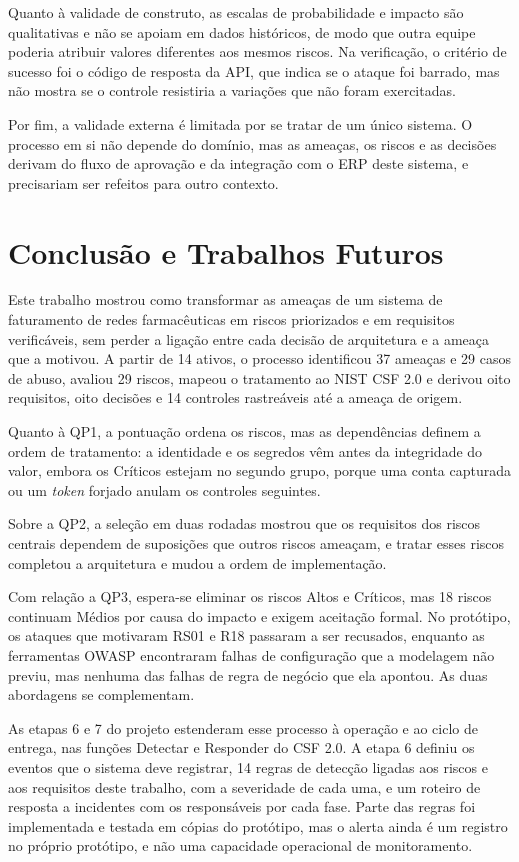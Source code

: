 \documentclass[conference]{IEEEtran}
\begin{document}
Quanto à validade de construto, as escalas de probabilidade e impacto são qualitativas e não se apoiam em dados históricos, de modo que outra equipe poderia atribuir valores diferentes aos mesmos riscos. Na verificação, o critério de sucesso foi o código de resposta da API, que indica se o ataque foi barrado, mas não mostra se o controle resistiria a variações que não foram exercitadas.

Por fim, a validade externa é limitada por se tratar de um único sistema. O processo em si não depende do domínio, mas as ameaças, os riscos e as decisões derivam do fluxo de aprovação e da integração com o ERP deste sistema, e precisariam ser refeitos para outro contexto.

\section{Conclusão e Trabalhos Futuros}
\label{sec:conclusao}

Este trabalho mostrou como transformar as ameaças de um sistema de faturamento de redes farmacêuticas em riscos priorizados e em requisitos verificáveis, sem perder a ligação entre cada decisão de arquitetura e a ameaça que a motivou. A partir de 14 ativos, o processo identificou 37 ameaças e 29 casos de abuso, avaliou 29 riscos, mapeou o tratamento ao NIST CSF 2.0 e derivou oito requisitos, oito decisões e 14 controles rastreáveis até a ameaça de origem.

Quanto à QP1, a pontuação ordena os riscos, mas as dependências definem a ordem de tratamento: a identidade e os segredos vêm antes da integridade do valor, embora os Críticos estejam no segundo grupo, porque uma conta capturada ou um \textit{token} forjado anulam os controles seguintes. 

Sobre a QP2, a seleção em duas rodadas mostrou que os requisitos dos riscos centrais dependem de suposições que outros riscos ameaçam, e tratar esses riscos completou a arquitetura e mudou a ordem de implementação. 

Com relação a QP3, espera-se eliminar os riscos Altos e Críticos, mas 18 riscos continuam Médios por causa do impacto e exigem aceitação formal. No protótipo, os ataques que motivaram RS01 e R18 passaram a ser recusados, enquanto as ferramentas OWASP encontraram falhas de configuração que a modelagem não previu, mas nenhuma das falhas de regra de negócio que ela apontou. As duas abordagens se complementam.

As etapas 6 e 7 do projeto estenderam esse processo à operação e ao ciclo de entrega, nas funções Detectar e Responder do CSF 2.0. A etapa 6 definiu os eventos que o sistema deve registrar, 14 regras de detecção ligadas aos riscos e aos requisitos deste trabalho, com a severidade de cada uma, e um roteiro de resposta a incidentes com os responsáveis por cada fase. Parte das regras foi implementada e testada em cópias do protótipo, mas o alerta ainda é um registro no próprio protótipo, e não uma capacidade operacional de monitoramento. 
\end{document}
